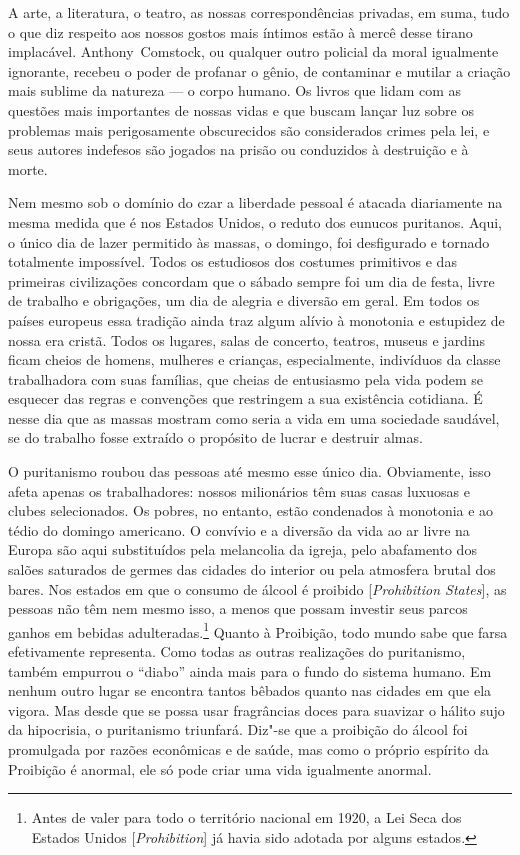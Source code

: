 A arte, a literatura, o teatro, as nossas correspondências privadas, em
suma, tudo o que diz respeito aos nossos gostos mais íntimos estão à
mercê desse tirano implacável. Anthony~Comstock, ou qualquer outro
policial da moral igualmente ignorante, recebeu o poder de profanar o
gênio, de contaminar e mutilar a criação mais sublime da natureza --- o
corpo humano. Os livros que lidam com as questões mais importantes de
nossas vidas e que buscam lançar luz sobre os problemas mais
perigosamente obscurecidos são considerados crimes pela lei, e seus
autores indefesos são jogados na prisão ou conduzidos à destruição e à
morte.

Nem mesmo sob o domínio do czar a liberdade pessoal é atacada
diariamente na mesma medida que é nos Estados Unidos, o reduto dos
eunucos puritanos. Aqui, o único dia de lazer permitido às massas, o
domingo, foi desfigurado e tornado totalmente impossível. Todos os
estudiosos dos costumes primitivos e das primeiras civilizações
concordam que o sábado sempre foi um dia de festa, livre de trabalho e
obrigações, um dia de alegria e diversão em geral. Em todos os países
europeus essa tradição ainda traz algum alívio à monotonia e estupidez
de nossa era cristã. Todos os lugares, salas de concerto, teatros, 
museus e jardins ficam cheios de homens, mulheres e crianças,
especialmente, indivíduos da classe trabalhadora com suas famílias, que
cheias de entusiasmo pela vida podem se esquecer das regras e convenções
que restringem a sua existência cotidiana. É nesse dia que as massas
mostram como seria a vida em uma sociedade saudável, se do trabalho
fosse extraído o propósito de lucrar e destruir almas.

O puritanismo roubou das pessoas até mesmo esse único dia. Obviamente,
isso afeta apenas os trabalhadores: nossos milionários têm suas casas
luxuosas e clubes selecionados. Os pobres, no entanto, estão condenados
à monotonia e ao tédio do domingo americano. O convívio e a diversão da
vida ao ar livre na Europa são aqui substituídos pela melancolia da
igreja, pelo abafamento dos salões saturados de germes das cidades do
interior ou pela atmosfera brutal dos bares. Nos estados em que o
consumo de álcool é proibido {[}\emph{Prohibition States}{]}, as pessoas
não têm nem mesmo isso, a menos que possam investir seus parcos ganhos
em bebidas adulteradas.\footnote{Antes de valer para todo o território
  nacional em 1920, a Lei Seca dos Estados Unidos
  {[}\emph{Prohibition}{]} já havia sido adotada por alguns estados.}
Quanto à Proibição, todo mundo sabe que farsa efetivamente representa.
Como todas as outras realizações do puritanismo, também empurrou o
``diabo'' ainda mais para o fundo do sistema humano. Em nenhum outro
lugar se encontra tantos bêbados quanto nas cidades em que ela vigora. 
Mas desde que se possa usar fragrâncias doces para suavizar o
hálito sujo da hipocrisia, o puritanismo triunfará. Diz"-se que a
proibição do álcool foi promulgada por razões econômicas e de saúde, mas
como o próprio espírito da Proibição é anormal, ele só pode criar uma
vida igualmente anormal.

